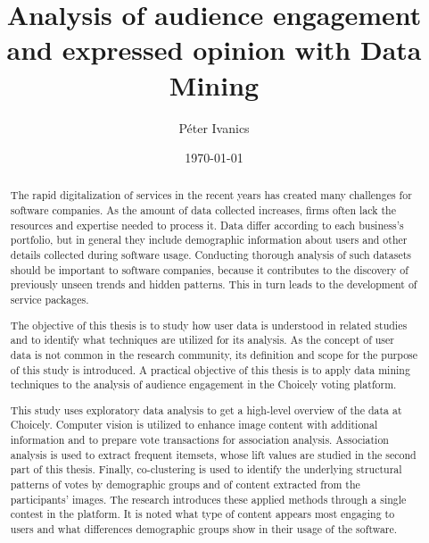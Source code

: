 \documentclass[english]{tktltiki}
\begin{document}
\onehalfspacing

\title{Analysis of audience engagement and expressed opinion with Data Mining}
\author{P\'eter Ivanics}

\date{\today}

\maketitle


\begin{abstract}
The rapid digitalization of services in the recent years has created many challenges for software companies. As the amount of data collected increases, firms often lack the resources and expertise needed to process it. Data differ according to each business's portfolio, but in general they include demographic information about users and other details collected during software usage. Conducting thorough analysis of such datasets should be important to software companies, because it contributes to the discovery of previously unseen trends and hidden patterns. This in turn leads to the development of service packages. 

The objective of this thesis is to study how user data is understood in related studies and to identify what techniques are utilized for its analysis. As the concept of user data is not common in the research community, its definition and scope for the purpose of this study is introduced. A practical objective of this thesis is to apply data mining techniques to the analysis of audience engagement in the Choicely voting platform. 

This study uses exploratory data analysis to get a high-level overview of the data at Choicely. Computer vision is utilized to enhance image content with additional information and to prepare vote transactions for association analysis. Association analysis is used to extract frequent itemsets, whose lift values are studied in the second part of this thesis. Finally, co-clustering is used to identify the underlying structural patterns of votes by demographic groups and of content extracted from the participants' images. The research introduces these applied methods through a single contest in the platform. It is noted what type of content appears most engaging to users and what differences demographic groups show in their usage of the software.


\end{abstract}
\end{document}
